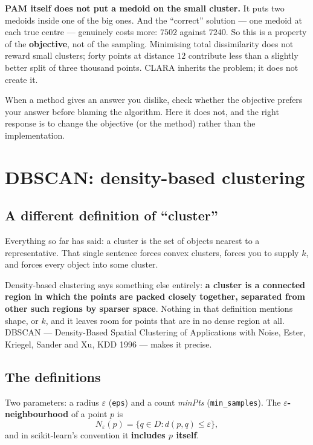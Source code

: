 \documentclass[11pt]{article}
\begin{document}
\textbf{PAM itself does not put a medoid on the small cluster.} It puts two
medoids inside one of the big ones. And the ``correct'' solution --- one
medoid at each true centre --- genuinely costs more: $7502$ against $7240$.
So this is a property of the \textbf{objective}, not of the sampling.
Minimising total dissimilarity does not reward small clusters; forty points
at distance $12$ contribute less than a slightly better split of three
thousand points. CLARA inherits the problem; it does not create it.

\begin{keyidea}
When a method gives an answer you dislike, check whether the objective
prefers your answer before blaming the algorithm. Here it does not, and the
right response is to change the objective (or the method) rather than the
implementation.
\end{keyidea}

\section{DBSCAN: density-based clustering}
\label{sec:dbscan}

\subsection{A different definition of ``cluster''}

Everything so far has said: a cluster is the set of objects nearest to a
representative. That single sentence forces convex clusters, forces you to
supply $k$, and forces every object into some cluster.

Density-based clustering says something else entirely: \textbf{a cluster is a
connected region in which the points are packed closely together, separated
from other such regions by sparser space}. Nothing in that definition mentions
shape, or $k$, and it leaves room for points that are in no dense region at
all. DBSCAN --- Density-Based Spatial Clustering of Applications with Noise,
Ester, Kriegel, Sander and Xu, KDD 1996 --- makes it precise.

\subsection{The definitions}

Two parameters: a radius $\varepsilon$ (\texttt{eps}) and a count
\emph{minPts} (\texttt{min\_samples}). The \textbf{$\varepsilon$-neighbourhood}
of a point $p$ is
\[
  N_\varepsilon(p) = \{q \in D : d(p,q) \le \varepsilon\},
\]
and in scikit-learn's convention it \textbf{includes $p$ itself}.
\end{document}
